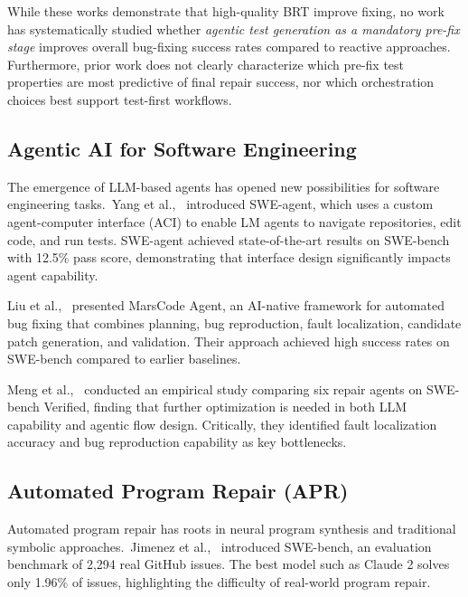 \documentclass[12pt]{article}
\begin{document}
While these works demonstrate that high-quality BRT improve fixing, no work has systematically studied whether \emph{agentic test generation as a mandatory pre-fix stage} improves overall bug-fixing success rates compared to reactive approaches. Furthermore, prior work does not clearly characterize which pre-fix test properties are most predictive of final repair success, nor which orchestration choices best support test-first workflows.

\subsection{Agentic AI for Software Engineering}

The emergence of LLM-based agents has opened new possibilities for software engineering tasks.~Yang et al.,~\cite{Yang2024SWEagent} introduced SWE-agent, which uses a custom agent-computer interface (ACI) to enable LM agents to navigate repositories, edit code, and run tests. SWE-agent achieved state-of-the-art results on SWE-bench with 12.5\% pass score, demonstrating that interface design significantly impacts agent capability.

Liu et al.,~\cite{Liu2024MarsCode} presented MarsCode Agent, an AI-native framework for automated bug fixing that combines planning, bug reproduction, fault localization, candidate patch generation, and validation. Their approach achieved high success rates on SWE-bench compared to earlier baselines.

Meng et al.,~\cite{Meng2024Empirical} conducted an empirical study comparing six repair agents on SWE-bench Verified, finding that further optimization is needed in both LLM capability and agentic flow design. Critically, they identified fault localization accuracy and bug reproduction capability as key bottlenecks.


\subsection{Automated Program Repair (APR)}

Automated program repair has roots in neural program synthesis and traditional symbolic approaches.~Jimenez et al.,~\cite{Jimenez2023SWEbench} introduced SWE-bench, an evaluation benchmark of 2,294 real GitHub issues. The best model such as Claude 2 solves only 1.96\% of issues, highlighting the difficulty of real-world program repair.
\end{document}
